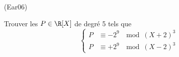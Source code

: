 \begin{tiny}(Ear06)\end{tiny} Trouver les $P\in \R[X]$ de degré 5 tels que
\[
\left\lbrace 
\begin{aligned}
 P &\equiv - 2^9 \;\mod (X+2)^3 \\ 
 P &\equiv + 2^9 \;\mod (X-2)^3 
\end{aligned}
 \right.
\]
